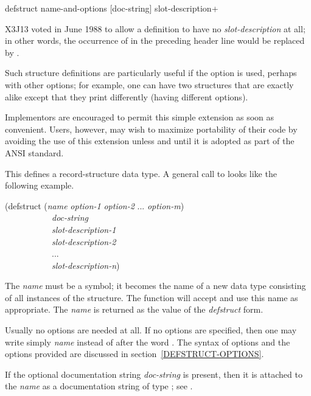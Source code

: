\begin{defmac}
defstruct name-and-options [doc-string] {slot-description}+

\begin{new}\noindent
X3J13 voted in June 1988
to allow a  definition
to have no \emph{slot-description} at all; in other words, the
occurrence of  in the preceding
header line would be replaced by .

Such structure definitions are particularly useful if the
 option is used, perhaps with other options; for example,
one can have two structures that are exactly alike except that they
print differently (having different  options).

Implementors are encouraged to permit this simple extension as soon as
convenient.  Users, however, may wish to maximize portability of their
code by avoiding the use of this extension unless and until it is
adopted as part of the ANSI standard.
\end{new}

This defines a record-structure data type.
A general call to  looks like the following example.
\begin{lisp}
(defstruct (\emph{name} \emph{option-1} \emph{option-2} ... \emph{option-m}) \\
~~~~~~~~~~~\emph{doc-string} \\
~~~~~~~~~~~\emph{slot-description-1} \\
~~~~~~~~~~~\emph{slot-description-2} \\
~~~~~~~~~~~... \\
~~~~~~~~~~~\emph{slot-description-n}) \\
\end{lisp}
The \emph{name} must be a symbol; it becomes the name of a new data type
consisting of all instances of the structure.
The function  will accept and use this name
as appropriate.  The \emph{name} is returned as the value of the \emph{defstruct}
form.

Usually no options are needed at all.
If no options are specified, then one may write simply \emph{name} instead
of  after the word .  The syntax of options
and the options provided are discussed in section~\ref{DEFSTRUCT-OPTIONS}.

If the optional documentation string \emph{doc-string} is present,
then it is attached to the \emph{name}
as a documentation string of type ; see .


\end{defmac}
